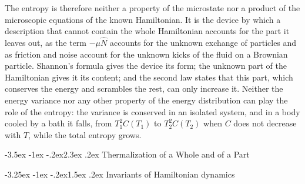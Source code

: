 \documentclass[10pt,a4paper]{article}
\makeatletter
\renewcommand{\section}{\@startsection{section}{1}{\z@}%
  {-3.5ex \@plus -1ex \@minus -.2ex}{2.3ex \@plus .2ex}%
  {\normalfont\fontsize{18pt}{22pt}\selectfont\bfseries}}
\renewcommand{\subsection}{\@startsection{subsection}{2}{\z@}%
  {-3.25ex \@plus -1ex \@minus -.2ex}{1.5ex \@plus .2ex}%
  {\normalfont\fontsize{15.5pt}{19pt}\selectfont\bfseries}}
\makeatother
\begin{document}
The entropy is therefore neither a property of the microstate nor a product of the microscopic equations of the known Hamiltonian.
It is the device by which a description that cannot contain the whole Hamiltonian accounts for the part it leaves out, as the term $ -\mu\hat N $ accounts for the unknown exchange of particles and as friction and noise account for the unknown kicks of the fluid on a Brownian particle.
Shannon's formula gives the device its form; the unknown part of the Hamiltonian gives it its content; and the second law states that this part, which conserves the energy and scrambles the rest, can only increase it.
Neither the energy variance nor any other property of the energy distribution can play the role of the entropy: the variance is conserved in an isolated system, and in a body cooled by a bath it falls, from $ T_1^{2}C(T_1) $ to $ T_2^{2}C(T_2) $ when $ C $ does not decrease with $ T $, while the total entropy grows.

\section{Thermalization of a Whole and of a Part}
\label{sec:defs}

\subsection{Invariants of Hamiltonian dynamics}
\label{sec:invariants}
\end{document}
